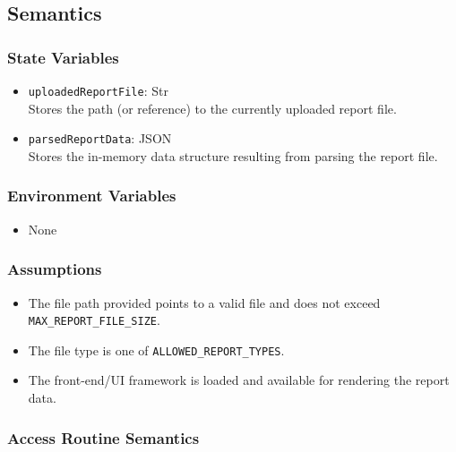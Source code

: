 \documentclass[12pt, titlepage]{article}
\begin{document}
\subsection{Semantics}

\subsubsection{State Variables}

\begin{itemize}
    \item \texttt{uploadedReportFile}: Str \\
    Stores the path (or reference) to the currently uploaded report file.
    \item \texttt{parsedReportData}: JSON \\
     Stores the in-memory data structure resulting from parsing the report file.
\end{itemize}

\subsubsection{Environment Variables}

\begin{itemize}
    \item None
\end{itemize}

\subsubsection{Assumptions}

\begin{itemize}
    \item The file path provided points to a valid file and does not exceed \texttt{MAX\_REPORT\_FILE\_SIZE}.
    \item The file type is one of \texttt{ALLOWED\_REPORT\_TYPES}.
    \item The front-end/UI framework is loaded and available for rendering the report data.
\end{itemize}

\subsubsection{Access Routine Semantics}
\end{document}
